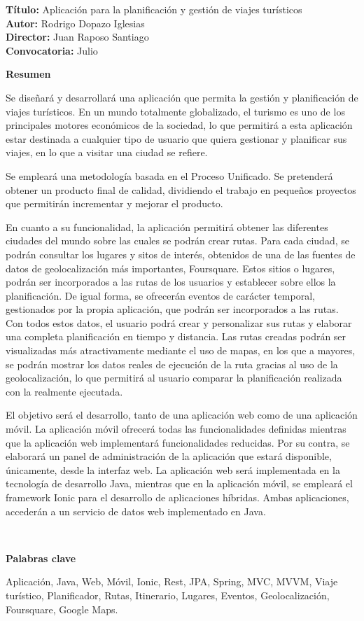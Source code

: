 \documentclass[a4paper,12pt,twoside]{book}
\begin{document}
\cleardoublepage
\begin{flushright}
\large{
\textbf{Título: } Aplicación para la planificación y gestión
de viajes turísticos\\
\textbf{Autor: } Rodrigo Dopazo Iglesias\\
\textbf{Director: } Juan Raposo Santiago\\
\textbf{Convocatoria: } Julio\\
\hfill \break}
\end{flushright}

\noindent
\textbf{\LARGE{Resumen}}


Se diseñará y desarrollará una aplicación que permita la gestión y planificación de viajes turísticos. En un mundo totalmente globalizado, el turismo es uno de los principales motores económicos de la sociedad, lo que permitirá a esta aplicación estar destinada a cualquier tipo de usuario que quiera gestionar y planificar sus viajes, en lo que a visitar una ciudad se refiere.

Se empleará una metodología basada en el Proceso Unificado. Se pretenderá obtener un producto final de calidad, dividiendo el trabajo en pequeños proyectos que permitirán incrementar y mejorar el producto.

En cuanto a su funcionalidad, la aplicación permitirá obtener las diferentes ciudades del mundo sobre las cuales se podrán crear rutas. Para cada ciudad, se podrán consultar los lugares y sitos de interés, obtenidos de una de las fuentes de datos de geolocalización más importantes, Foursquare. Estos sitios o lugares, podrán ser incorporados a las rutas de los usuarios y establecer sobre ellos la planificación. De igual forma, se ofrecerán eventos de carácter temporal, gestionados por la propia aplicación, que podrán ser incorporados a las rutas. Con todos estos datos, el usuario podrá crear y personalizar sus rutas y elaborar una completa planificación en tiempo y distancia. Las rutas creadas podrán ser visualizadas más atractivamente mediante el uso de mapas, en los que a mayores, se podrán mostrar los datos reales de ejecución de la ruta gracias al uso de la geolocalización, lo que permitirá al usuario comparar la planificación realizada con la realmente ejecutada.

El objetivo será el desarrollo, tanto de una aplicación web como de una aplicación móvil. La aplicación móvil ofrecerá todas las funcionalidades definidas mientras que la aplicación web implementará funcionalidades reducidas. Por su contra, se elaborará un panel de administración de la aplicación que estará disponible, únicamente, desde la interfaz web. La aplicación web será implementada en la tecnología de desarrollo Java, mientras que en la aplicación móvil, se empleará el framework Ionic para el desarrollo de aplicaciones híbridas. Ambas aplicaciones, accederán a un servicio de datos web implementado en Java.

\
\

\noindent
\textbf{\LARGE{Palabras clave}}

Aplicación, Java, Web, Móvil, Ionic, Rest, JPA, Spring, MVC, MVVM, Viaje turístico, Planificador, Rutas, Itinerario, Lugares, Eventos, Geolocalización, Foursquare, Google Maps.
\end{document}
